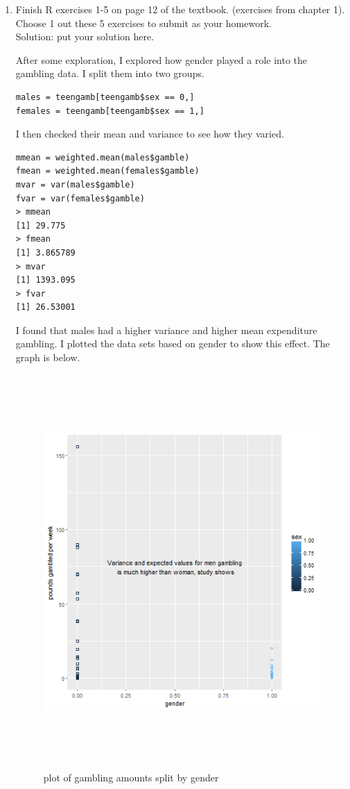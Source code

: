 \documentclass[11pt]{article}
\begin{document}
\begin{enumerate}

\item Finish R exercises 1-5 on page 12 of the textbook. (exercises from chapter 1). Choose 1 out these 5 exercises to submit as your homework.\\
{\color{blue} Solution: put your solution here.
}

After some exploration, I explored how gender played a role into the gambling data. I split them into two groups.
\begin{verbatim}
males = teengamb[teengamb$sex == 0,]
females = teengamb[teengamb$sex == 1,]
\end{verbatim}
I then checked their mean and variance to see how they varied.
\begin{verbatim}
mmean = weighted.mean(males$gamble)
fmean = weighted.mean(females$gamble)
mvar = var(males$gamble)
fvar = var(females$gamble)
> mmean
[1] 29.775
> fmean
[1] 3.865789
> mvar
[1] 1393.095
> fvar
[1] 26.53001
\end{verbatim}

I found that males had a higher variance and higher mean expenditure gambling. I plotted the data sets based on gender to show this effect. The graph is below.
\begin{figure}[H]
	\centering
	\includegraphics[width=15cm,height=15cm]{expenses.png}
	\caption[expenses]{plot of gambling amounts split by gender}
	\label{rVals}
\end{figure}


\end{enumerate}
\end{document}
